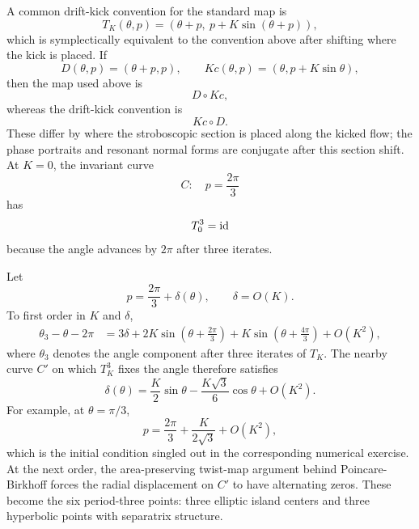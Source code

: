 \begin{example}
A common drift-kick convention for the standard map is
\[
  T_K(\theta,p)=\left(\theta+p,\ p+K\sin(\theta+p)\right),
\]
which is symplectically equivalent to the convention above after shifting where
the kick is placed. If
\[
  D(\theta,p)=(\theta+p,p),\qquad Kc(\theta,p)=(\theta,p+K\sin\theta),
\]
then the map used above is
\[
  D\circ Kc,
\]
whereas the drift-kick convention is
\[
  Kc\circ D.
\]
These differ by where the stroboscopic section is placed along the kicked flow;
the phase portraits and resonant normal forms are conjugate after this section
shift. At \(K=0\), the invariant curve
\[
  C:\quad p=\frac{2\pi}{3}
\]
has
\[
  T_0^3=\operatorname{id}
\]
because the angle advances by \(2\pi\) after three iterates.

Let
\[
  p=\frac{2\pi}{3}+\delta(\theta),
  \qquad
  \delta=O(K).
\]
To first order in \(K\) and \(\delta\),
\[
\begin{aligned}
  \theta_3-\theta-2\pi
  &=
  3\delta
  +
  2K\sin\left(\theta+\frac{2\pi}{3}\right)
  +
  K\sin\left(\theta+\frac{4\pi}{3}\right)
  +O(K^2),
\end{aligned}
\]
where \(\theta_3\) denotes the angle component after three iterates of
\(T_K\).
The nearby curve \(C'\) on which \(T_K^3\) fixes the angle therefore satisfies
\[
  \boxed{
  \delta(\theta)
  =
  \frac{K}{2}\sin\theta
  -
  \frac{K\sqrt3}{6}\cos\theta
  +
  O(K^2).
  }
\]
For example, at \(\theta=\pi/3\),
\[
  p=\frac{2\pi}{3}+\frac{K}{2\sqrt3}+O(K^2),
\]
which is the initial condition singled out in the corresponding numerical
exercise. At the next order, the area-preserving twist-map argument behind
Poincare-Birkhoff forces the radial displacement on \(C'\) to have alternating
zeros. These become the six period-three points: three elliptic island centers
and three hyperbolic points with separatrix structure.
\end{example}

